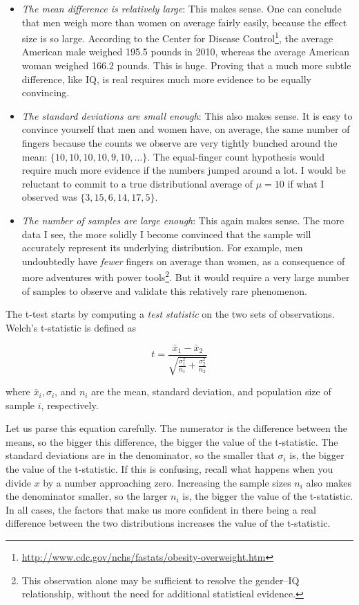\documentclass[10pt]{article}
\begin{document}
\begin{itemize}
    \item \textit{The mean difference is relatively large}: This makes sense. One can conclude that men weigh more than women on average fairly easily, because the effect size is so large. According to the Center for Disease Control\footnote{\url{http://www.cdc.gov/nchs/fastats/obesity-overweight.htm}}, the average American male weighed 195.5 pounds in 2010, whereas the average American woman weighed 166.2 pounds. This is huge. Proving that a much more subtle difference, like IQ, is real requires much more evidence to be equally convincing.
    \item \textit{The standard deviations are small enough}: This also makes sense. It is easy to convince yourself that men and women have, on average, the same number of fingers because the counts we observe are very tightly bunched around the mean: $\{10, 10, 10, 10, 9, 10, \ldots\}$. The equal-finger count hypothesis would require much more evidence if the numbers jumped around a lot. I would be reluctant to commit to a true distributional average of $\mu=10$ if what I observed was $\{3, 15, 6, 14, 17, 5\}$.
    \item \textit{The number of samples are large enough}: This again makes sense. The more data I see, the more solidly I become convinced that the sample will accurately represent its underlying distribution. For example, men undoubtedly have \textit{fewer} fingers on average than women, as a consequence of more adventures with power tools\footnote{This observation alone may be sufficient to resolve the gender–IQ relationship, without the need for additional statistical evidence.}. But it would require a very large number of samples to observe and validate this relatively rare phenomenon.
\end{itemize}

The t-test starts by computing a \textit{test statistic} on the two sets of observations. Welch's t-statistic is defined as

\[
    t = \frac{\bar{x}_{1} - \bar{x}_{2}}{\sqrt{\frac{\sigma_{1}^{2}}{n_{1}} + \frac{\sigma_{2}^{2}}{n_{2}}}}
\]

where $\bar{x}_{i}, \sigma_{i}$, and $n_{i}$ are the mean, standard deviation, and population size of sample $i$, respectively.

Let us parse this equation carefully. The numerator is the difference between the means, so the bigger this difference, the bigger the value of the t-statistic. The standard deviations are in the denominator, so the smaller that $\sigma_{i}$ is, the bigger the value of the t-statistic. If this is confusing, recall what happens when you divide $x$ by a number approaching zero. Increasing the sample sizes $n_{i}$ also makes the denominator smaller, so the larger $n_{i}$ is, the bigger the value of the t-statistic. In all cases, the factors that make us more confident in there being a real difference between the two distributions increases the value of the t-statistic.
\end{document}
